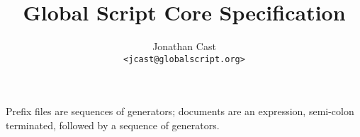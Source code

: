 \documentclass{report}
\title{Global Script Core Specification}
\author{Jonathan Cast\\\texttt{<jcast@globalscript.org>}}
\begin{document}
\maketitle

Prefix files are sequences of generators; documents are an expression, semi-colon terminated, followed by a sequence of generators.
\end{document}
